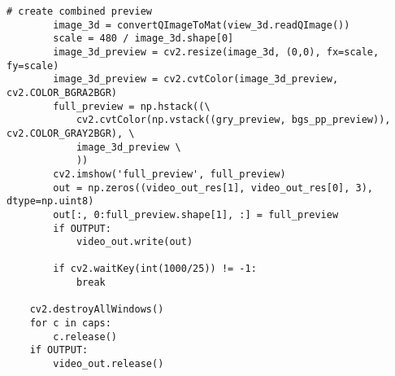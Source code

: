 \begin{lstlisting}[caption={Main function of the volume intersection program}, label={lst:app:volmain}]
        # create combined preview
        image_3d = convertQImageToMat(view_3d.readQImage())
        scale = 480 / image_3d.shape[0]
        image_3d_preview = cv2.resize(image_3d, (0,0), fx=scale, fy=scale)
        image_3d_preview = cv2.cvtColor(image_3d_preview, cv2.COLOR_BGRA2BGR)
        full_preview = np.hstack((\
            cv2.cvtColor(np.vstack((gry_preview, bgs_pp_preview)), cv2.COLOR_GRAY2BGR), \
            image_3d_preview \
            ))
        cv2.imshow('full_preview', full_preview)
        out = np.zeros((video_out_res[1], video_out_res[0], 3), dtype=np.uint8)
        out[:, 0:full_preview.shape[1], :] = full_preview
        if OUTPUT:
            video_out.write(out)

        if cv2.waitKey(int(1000/25)) != -1:
            break

    cv2.destroyAllWindows()
    for c in caps:
        c.release()
    if OUTPUT:
        video_out.release()
\end{lstlisting}